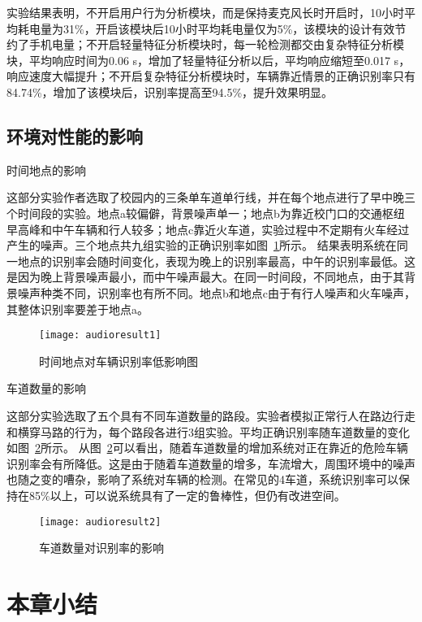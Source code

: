 实验结果表明，不开启用户行为分析模块，而是保持麦克风长时开启时，10小时平均耗电量为31\%，开启该模块后10小时平均耗电量仅为5\%，该模块的设计有效节约了手机电量；不开启轻量特征分析模块时，每一轮检测都交由复杂特征分析模块，平均响应时间为0.06 s，增加了轻量特征分析以后，平均响应缩短至0.017 s，响应速度大幅提升；不开启复杂特征分析模块时，车辆靠近情景的正确识别率只有84.74\%，增加了该模块后，识别率提高至94.5\%，提升效果明显。


\subsection{环境对性能的影响}
{\hei 时间地点的影响}

这部分实验作者选取了校园内的三条单车道单行线，并在每个地点进行了早中晚三个时间段的实验。地点a较偏僻，背景噪声单一；地点b为靠近校门口的交通枢纽早高峰和中午车辆和行人较多；地点c靠近火车道，实验过程中不定期有火车经过产生的噪声。三个地点共九组实验的正确识别率如图~\ref{fig:audioresult1}所示。
结果表明系统在同一地点的识别率会随时间变化，表现为晚上的识别率最高，中午的识别率最低。这是因为晚上背景噪声最小，而中午噪声最大。在同一时间段，不同地点，由于其背景噪声种类不同，识别率也有所不同。地点b和地点c由于有行人噪声和火车噪声，其整体识别率要差于地点a。

\begin{figure}[htbp] %
  \centering
  \texttt{[image: audioresult1]}
  \caption{时间地点对车辆识别率低影响图}
  \label{fig:audioresult1}
\end{figure}

{\hei 车道数量的影响}

这部分实验选取了五个具有不同车道数量的路段。实验者模拟正常行人在路边行走和横穿马路的行为，每个路段各进行3组实验。平均正确识别率随车道数量的变化如图~\ref{fig:audioresult2}所示。
从图~\ref{fig:audioresult2}可以看出，随着车道数量的增加系统对正在靠近的危险车辆识别率会有所降低。这是由于随着车道数量的增多，车流增大，周围环境中的噪声也随之变的嘈杂，影响了系统对车辆的检测。在常见的4车道，系统识别率可以保持在85\%以上，可以说系统具有了一定的鲁棒性，但仍有改进空间。

\begin{figure}[htbp] %
  \centering
  \texttt{[image: audioresult2]}
  \caption{车道数量对识别率的影响}
  \label{fig:audioresult2}
\end{figure}

\section{本章小结}

